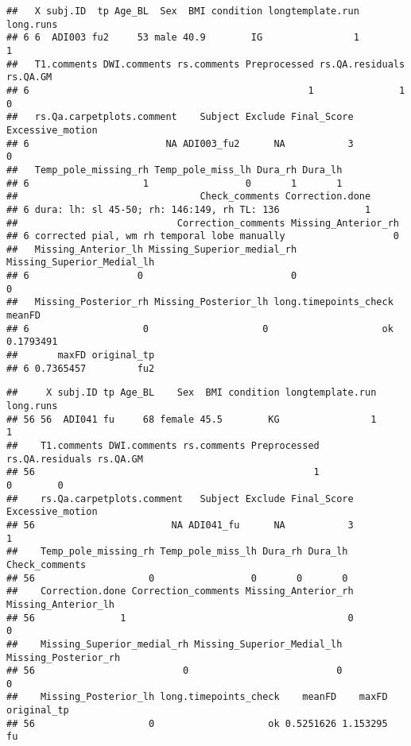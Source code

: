 \documentclass[
]{article}
\begin{document}
\begin{verbatim}
##   X subj.ID  tp Age_BL  Sex  BMI condition longtemplate.run long.runs
## 6 6  ADI003 fu2     53 male 40.9        IG                1         1
##   T1.comments DWI.comments rs.comments Preprocessed rs.QA.residuals rs.QA.GM
## 6                                                 1               1        0
##   rs.Qa.carpetplots.comment    Subject Exclude Final_Score Excessive_motion
## 6                        NA ADI003_fu2      NA           3                0
##   Temp_pole_missing_rh Temp_pole_miss_lh Dura_rh Dura_lh
## 6                    1                 0       1       1
##                                Check_comments Correction.done
## 6 dura: lh: sl 45-50; rh: 146:149, rh TL: 136               1
##                            Correction_comments Missing_Anterior_rh
## 6 corrected pial, wm rh temporal lobe manually                   0
##   Missing_Anterior_lh Missing_Superior_medial_rh Missing_Superior_Medial_lh
## 6                   0                          0                          0
##   Missing_Posterior_rh Missing_Posterior_lh long.timepoints_check    meanFD
## 6                    0                    0                    ok 0.1793491
##       maxFD original_tp
## 6 0.7365457         fu2
\end{verbatim}

\begin{verbatim}
##     X subj.ID tp Age_BL    Sex  BMI condition longtemplate.run long.runs
## 56 56  ADI041 fu     68 female 45.5        KG                1         1
##    T1.comments DWI.comments rs.comments Preprocessed rs.QA.residuals rs.QA.GM
## 56                                                 1               0        0
##    rs.Qa.carpetplots.comment   Subject Exclude Final_Score Excessive_motion
## 56                        NA ADI041_fu      NA           3                1
##    Temp_pole_missing_rh Temp_pole_miss_lh Dura_rh Dura_lh Check_comments
## 56                    0                 0       0       0               
##    Correction.done Correction_comments Missing_Anterior_rh Missing_Anterior_lh
## 56               1                                       0                   0
##    Missing_Superior_medial_rh Missing_Superior_Medial_lh Missing_Posterior_rh
## 56                          0                          0                    0
##    Missing_Posterior_lh long.timepoints_check    meanFD    maxFD original_tp
## 56                    0                    ok 0.5251626 1.153295          fu
\end{verbatim}
\end{document}
